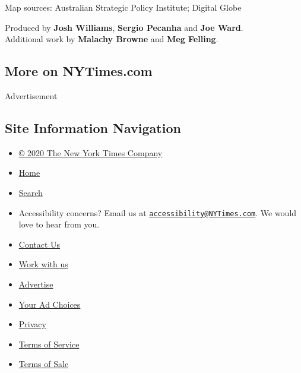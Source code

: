 Map sources: Australian Strategic Policy Institute; Digital Globe

Produced by \textbf{Josh Williams}, \textbf{Sergio Pecanha} and
\textbf{Joe Ward}.\\
Additional work by \textbf{Malachy Browne} and \textbf{Meg Felling}.

\hypertarget{more-on-nytimescom}{%
\subsection{More on NYTimes.com}\label{more-on-nytimescom}}

Advertisement

\hypertarget{site-information-navigation}{%
\subsection{Site Information
Navigation}\label{site-information-navigation}}

\begin{itemize}
\tightlist
\item
  \href{https://help.nytimes3xbfgragh.onion/hc/en-us/articles/115014792127-Copyright-notice}{©
  2020 The New York Times Company}
\item
  \href{https://www.nytimes3xbfgragh.onion}{Home}
\item
  \href{https://www.nytimes3xbfgragh.onion/search/}{Search}
\item
  Accessibility concerns? Email us at
  \href{mailto:accessibility@NYTimes.com}{\nolinkurl{accessibility@NYTimes.com}}.
  We would love to hear from you.
\item
  \href{https://help.nytimes3xbfgragh.onion/hc/en-us/articles/115015385887-Contact-Us}{Contact
  Us}
\item
  \href{https://www.nytco.com/careers/}{Work with us}
\item
  \href{https://nytmediakit.com/}{Advertise}
\item
  \href{https://help.nytimes3xbfgragh.onion/hc/en-us/articles/115014892108-Privacy-policy\#pp}{Your
  Ad Choices}
\item
  \href{https://help.nytimes3xbfgragh.onion/hc/en-us/articles/115014892108-Privacy-policy}{Privacy}
\item
  \href{https://help.nytimes3xbfgragh.onion/hc/en-us/articles/115014893428-Terms-of-service}{Terms
  of Service}
\item
  \href{https://help.nytimes3xbfgragh.onion/hc/en-us/articles/115014893968-Terms-of-sale}{Terms
  of Sale}
\end{itemize}


